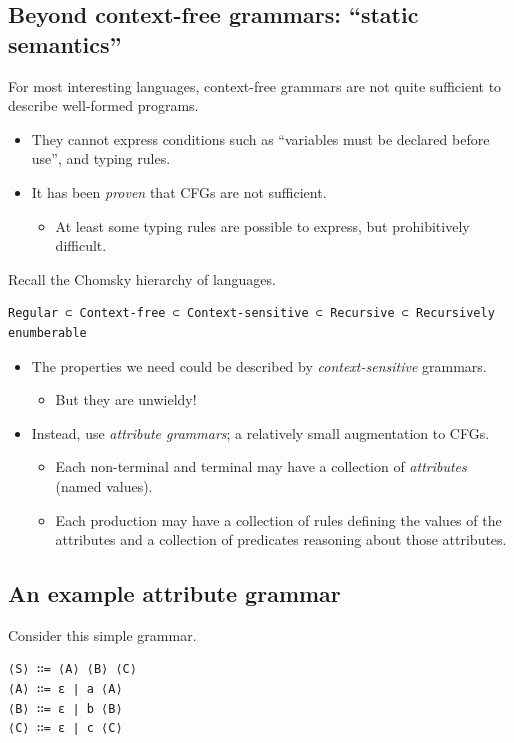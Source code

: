 \documentclass[11pt]{article}
\theoremstyle{definition}
\begin{document}
\subsection{Beyond context-free grammars: “static semantics”}
\label{sec:org149a248}

For most interesting languages,
context-free grammars are not quite sufficient
to describe well-formed programs.
\begin{itemize}
\item They cannot express conditions such as
“variables must be declared before use”, and
typing rules.
\item It has been \emph{proven} that CFGs are not sufficient.
\begin{itemize}
\item At least some typing rules are possible to express,
but prohibitively difficult.
\end{itemize}
\end{itemize}

Recall the Chomsky hierarchy of languages.
\begin{verbatim}
Regular ⊂ Context-free ⊂ Context-sensitive ⊂ Recursive ⊂ Recursively enumberable
\end{verbatim}
\begin{itemize}
\item The properties we need could be described by \emph{context-sensitive} grammars.
\begin{itemize}
\item But they are unwieldy!
\end{itemize}
\item Instead, use \emph{attribute grammars};
a relatively small augmentation to CFGs.
\begin{itemize}
\item Each non-terminal and terminal may have a collection
of \emph{attributes} (named values).
\item Each production may have a collection of
rules defining the values of the attributes
and a collection of predicates
reasoning about those attributes.
\end{itemize}
\end{itemize}

\subsection{An example attribute grammar}
\label{sec:orgae954ef}

Consider this simple grammar.
\begin{verbatim}
⟨S⟩ ∷= ⟨A⟩ ⟨B⟩ ⟨C⟩
⟨A⟩ ∷= ε ∣ a ⟨A⟩
⟨B⟩ ∷= ε ∣ b ⟨B⟩
⟨C⟩ ∷= ε ∣ c ⟨C⟩
\end{verbatim}
\end{document}
